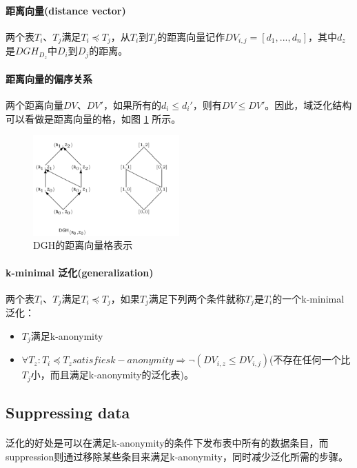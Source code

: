\documentclass[12pt,a4paper]{article}
\begin{document}
\paragraph{距离向量(distance vector)} 两个表$T_i$、$T_j$满足$T_i \preceq T_j$，从$T_i$到$T_j$的距离向量记作$DV_{i,j}=[d_1,...,d_n]$，其中$d_z$是$DGH_{D_z}$中$D_i$到$D_j$的距离。
\paragraph{距离向量的偏序关系} 两个距离向量$DV$、$DV'$，如果所有的$d_i \leq d_i'$，则有$DV \leq DV'$。因此，域泛化结构可以看做是距离向量的格，如图 \ref{lattice-on-dv} 所示。
\begin{figure}[H]
	\centering
	\includegraphics[width=0.5\textwidth]{../images/lattice-on-dv.png}
	\caption{DGH的距离向量格表示}
	\label{lattice-on-dv}
\end{figure}

\paragraph{k-minimal 泛化(generalization)} 两个表$T_i$、$T_j$满足$T_i \preceq T_j$，如果$T_j$满足下列两个条件就称$T_j$是$T_i$的一个k-minimal泛化：
\begin{itemize}
	\item $T_j$满足k-anonymity
	\item $\forall T_z: T_i \preceq T_z satisfies k-anonymity \Rightarrow \neg (DV_{i,z} \leq DV_{i,j})$(不存在任何一个比$T_j$小，而且满足k-anonymity的泛化表)。
\end{itemize}

\subsection{Suppressing data}
\paragraph{} 泛化的好处是可以在满足k-anonymity的条件下发布表中所有的数据条目，而suppression则通过移除某些条目来满足k-anonymity，同时减少泛化所需的步骤。
\end{document}
